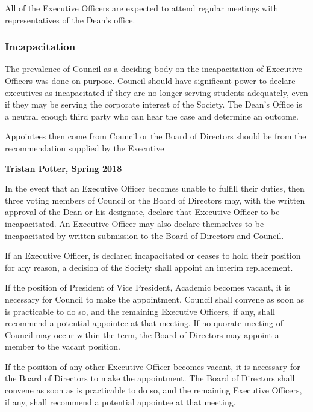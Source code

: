 All of the Executive Officers are expected to attend regular meetings with
representatives of the Dean’s office.

\subsubsection{Incapacitation}
\begin{annotation}
    The prevalence of Council as a deciding body on the incapacitation of 
    Executive Officers was done on purpose. Council should have significant
    power to declare executives as incapacitated if they are no longer
    serving students adequately, even if they may be serving the corporate
    interest of the Society. The Dean's Office is a neutral enough third party
    who can hear the case and determine an outcome.

    Appointees then come from Council or the Board of Directors should be from
    the recommendation supplied by the Executive

    \textbf{Tristan Potter, Spring 2018}
\end{annotation}

In the event that an Executive Officer becomes unable to fulfill their duties,
then three voting members of Council or the Board of Directors may,
with the written approval of the Dean or his designate, declare that Executive
Officer to be incapacitated. An Executive Officer may also declare themselves
to be incapacitated by written submission to the Board of Directors and
Council.

If an Executive Officer, is declared incapacitated or ceases to hold their
position for any reason, a decision of the Society shall appoint an interim
replacement. 

If the position of President of Vice President, Academic becomes vacant, it
is necessary for Council to make the appointment. Council shall convene
as soon as is practicable to do so, and the remaining Executive Officers, if
any, shall recommend a potential appointee at that meeting. If no quorate
meeting of Council may occur within the term, the Board of Directors may 
appoint a member to the vacant position.

If the position of any other Executive Officer becomes vacant, it is necessary
for the Board of  Directors to make the appointment. The Board of
Directors shall convene as soon as is practicable to do so, and the remaining
Executive Officers, if any, shall recommend a potential appointee at that
meeting.

